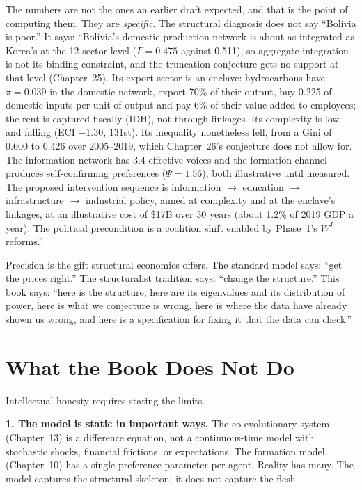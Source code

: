 \documentclass[../structural_economics_book.tex]{subfiles}
\begin{document}
The numbers are not the ones an earlier draft expected, and that is the point of computing them. They are \textit{specific}. The structural diagnosis does not say ``Bolivia is poor.'' It says: ``Bolivia's domestic production network is about as integrated as Korea's at the 12-sector level ($\Gamma = 0.475$ against 0.511), so aggregate integration is not its binding constraint, and the truncation conjecture gets no support at that level (Chapter~25). Its export sector is an enclave: hydrocarbons have $\pi = 0.039$ in the domestic network, export 70\% of their output, buy 0.225 of domestic inputs per unit of output and pay 6\% of their value added to employees; the rent is captured fiscally (IDH), not through linkages. Its complexity is low and falling (ECI $-1.30$, 131st). Its inequality nonetheless fell, from a Gini of 0.600 to 0.426 over 2005--2019, which Chapter~26's conjecture does not allow for. The information network has 3.4 effective voices and the formation channel produces self-confirming preferences ($\Psi = 1.56$), both illustrative until measured. The proposed intervention sequence is information $\to$ education $\to$ infrastructure $\to$ industrial policy, aimed at complexity and at the enclave's linkages, at an illustrative cost of \$17B over 30 years (about 1.2\% of 2019 GDP a year). The political precondition is a coalition shift enabled by Phase~1's $W^I$ reforms.''

Precision is the gift structural economics offers. The standard model says: ``get the prices right.'' The structuralist tradition says: ``change the structure.'' This book says: ``here is the structure, here are its eigenvalues and its distribution of power, here is what we conjecture is wrong, here is where the data have already shown us wrong, and here is a specification for fixing it that the data can check.''


\section{What the Book Does Not Do}
\label{ch28:sec:limits}

Intellectual honesty requires stating the limits.

\textbf{1. The model is static in important ways.} The co-evolutionary system (Chapter~13) is a difference equation, not a continuous-time model with stochastic shocks, financial frictions, or expectations. The formation model (Chapter~10) has a single preference parameter per agent. Reality has many. The model captures the structural skeleton; it does not capture the flesh.
\end{document}
